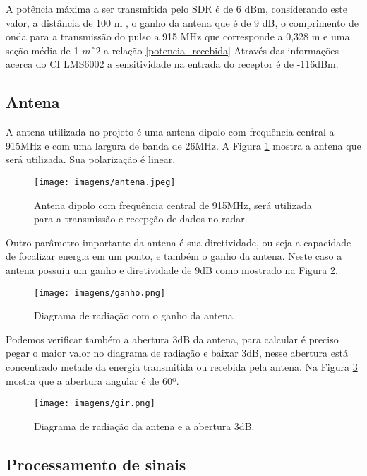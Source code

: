 A potência máxima a ser transmitida pelo SDR é de 6 dBm, considerando este valor, a distância de 100 m , o ganho da antena que é de 9  dB, o comprimento de onda para a transmissão do pulso a 915 MHz que corresponde a 0,328 m e uma seção média de 1 $mˆ2$ a relação \ref{potencia_recebida}
Através das informações acerca do CI LMS6002 a sensitividade na entrada do receptor é de -116dBm.

\subsection{Antena}
A antena utilizada no projeto é uma antena dipolo com frequência central a 915MHz e com uma largura de banda de 26MHz. A Figura \ref{antena} mostra a antena que será utilizada. Sua polarização é linear. 

\begin{figure}[H]
    \centering
   \texttt{[image: imagens/antena.jpeg]}
   \caption{Antena dipolo com frequência central de 915MHz, será utilizada para a transmissão e recepção de dados no radar.}
   \label{antena}
    \end{figure}

Outro parâmetro importante da antena é sua diretividade, ou seja a capacidade de focalizar energia em um ponto, e também o ganho da antena. Neste caso a antena possuiu um ganho e diretividade de 9dB como mostrado na Figura \ref{ganho}.

\begin{figure}[H]
    \centering
   \texttt{[image: imagens/ganho.png]}
   \caption{Diagrama de radiação com o ganho da antena.}
   \label{ganho}
    \end{figure}

Podemos verificar também a abertura 3dB da antena, para calcular é preciso pegar o maior valor no diagrama de radiação e baixar 3dB, nesse abertura está concentrado metade da energia transmitida ou recebida pela antena. Na Figura \ref{dr} mostra que a abertura angular é de 60º.

\begin{figure}[t]
    \centering
   \texttt{[image: imagens/gir.png]}
   \caption{Diagrama de radiação da antena e a
abertura 3dB.}
   \label{dr}
    \end{figure}


\subsection{Processamento de sinais}
 
